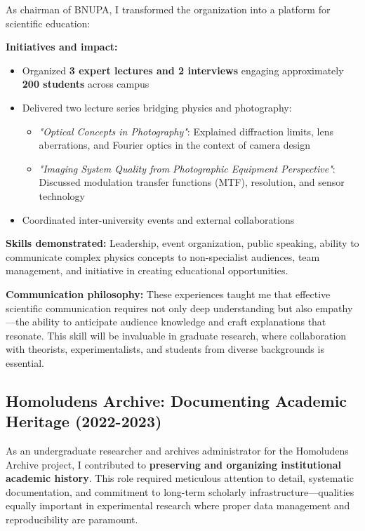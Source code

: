 \documentclass[11pt,a4paper]{article}
\begin{document}
As chairman of BNUPA, I transformed the organization into a platform for scientific education:

\textbf{Initiatives and impact:}
\begin{itemize}
    \item Organized \textbf{3 expert lectures and 2 interviews} engaging approximately \textbf{200 students} across campus
    \item Delivered two lecture series bridging physics and photography:
    \begin{itemize}
        \item \textit{"Optical Concepts in Photography"}: Explained diffraction limits, lens aberrations, and Fourier optics in the context of camera design
        \item \textit{"Imaging System Quality from Photographic Equipment Perspective"}: Discussed modulation transfer functions (MTF), resolution, and sensor technology
    \end{itemize}
    \item Coordinated inter-university events and external collaborations
\end{itemize}

\textbf{Skills demonstrated:} Leadership, event organization, public speaking, ability to communicate complex physics concepts to non-specialist audiences, team management, and initiative in creating educational opportunities.

\textbf{Communication philosophy:} These experiences taught me that effective scientific communication requires not only deep understanding but also empathy—the ability to anticipate audience knowledge and craft explanations that resonate. This skill will be invaluable in graduate research, where collaboration with theorists, experimentalists, and students from diverse backgrounds is essential.

\subsection{Homoludens Archive: Documenting Academic Heritage (2022-2023)}

As an undergraduate researcher and archives administrator for the Homoludens Archive project, I contributed to \textbf{preserving and organizing institutional academic history}. This role required meticulous attention to detail, systematic documentation, and commitment to long-term scholarly infrastructure—qualities equally important in experimental research where proper data management and reproducibility are paramount.
\end{document}
